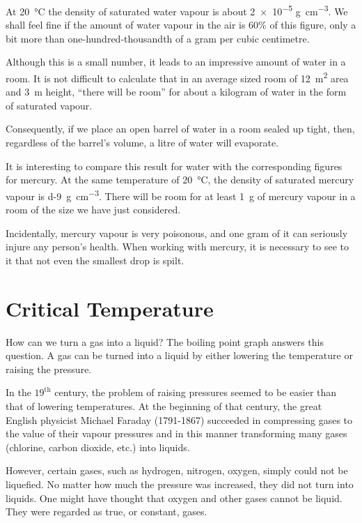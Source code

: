 At \SI{20}{\celsius} the density of saturated water vapour is about \num{2e-5} \si{\gram\per\centi\meter\cubed}. We shall feel fine if the amount of water vapour in the air is 60\% of this figure, only a bit more than one-hundred-thousandth of a gram per cubic centi­metre.

Although this is a small number, it leads to an impres­sive amount of water in a room. It is not difficult to calculate that in an average sized room of \SI{12}{\meter\squared} area and \SI{3}{\meter} height, ``there will be room'' for about a kilogram of water in the form of saturated vapour.

Consequently, if we place an open barrel of water in a room sealed up tight, then, regardless of the barrel’s volume, a litre of water will evaporate.

It is interesting to compare this result for water with the corresponding figures for mercury. At the same tem­perature of \SI{20}{\celsius}, the density of saturated mercury vapour is \SI{d-9}{\gram\per\centi\meter\cubed}. There will be room for at least \SI{1}{\gram} of mercury vapour in a room of the size we have just considered.

Incidentally, mercury vapour is very poisonous, and one gram of it can seriously injure any person’s health. When working with mercury, it is necessary to see to it that not even the smallest drop is spilt.

\section{Critical Temperature}

How can we turn a gas into a liquid? The boiling point graph answers this question. A gas can be turned into a liquid by either lowering the temperature or raising the pressure.

In the $19^{\textrm{th}}$ century, the problem of raising pressures seemed to be easier than that of lowering temperatures. At the beginning of that century, the great English phys­icist Michael Faraday (1791-1867) succeeded in compress­ing gases to the value of their vapour pressures and in this manner transforming many gases (chlorine, carbon dioxide, etc.) into liquids.

However, certain gases, such as hydrogen, nitrogen, oxygen, simply could not be liquefied. No matter how much the pressure was increased, they did not turn into liquids. One might have thought that oxygen and other gases cannot be liquid. They were regarded as true, or constant, gases.

